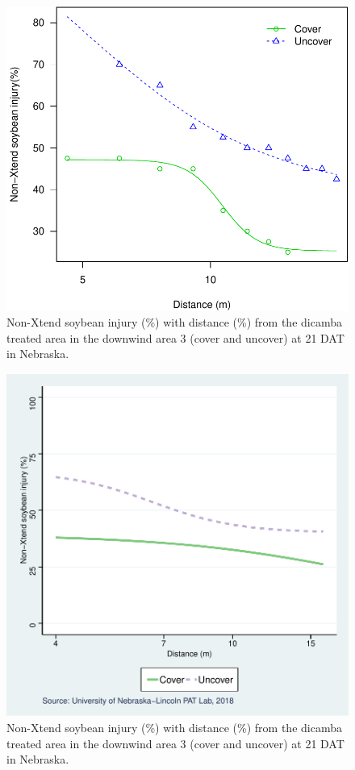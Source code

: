 \documentclass[]{article}
\begin{document}
\begin{figure}
\centering
\includegraphics{Report_Dicamba_study_files/figure-latex/unnamed-chunk-74-1.pdf}
\caption{Non-Xtend soybean injury (\%) with distance (\%) from the
dicamba treated area in the downwind area 3 (cover and uncover) at 21
DAT in Nebraska.}
\end{figure}

\begin{figure}
\centering
\includegraphics{Report_Dicamba_study_files/figure-latex/unnamed-chunk-75-1.pdf}
\caption{Non-Xtend soybean injury (\%) with distance (\%) from the
dicamba treated area in the downwind area 3 (cover and uncover) at 21
DAT in Nebraska.}
\end{figure}
\end{document}
